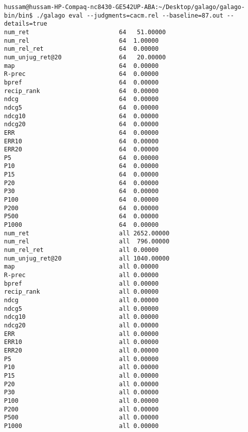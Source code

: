 \begin{lstlisting}[breakatwhitespace=〈false)]
hussam@hussam-HP-Compaq-nc8430-GE542UP-ABA:~/Desktop/galago/galago-bin/bin$ ./galago eval --judgments=cacm.rel --baseline=87.out --details=true
num_ret                      	64   51.00000
num_rel                      	64	1.00000
num_rel_ret                  	64	0.00000
num_unjug_ret@20             	64   20.00000
map                          	64	0.00000
R-prec                       	64	0.00000
bpref                        	64	0.00000
recip_rank                   	64	0.00000
ndcg                         	64	0.00000
ndcg5                        	64	0.00000
ndcg10                       	64	0.00000
ndcg20                       	64	0.00000
ERR                          	64	0.00000
ERR10                        	64	0.00000
ERR20                        	64	0.00000
P5                           	64	0.00000
P10                          	64	0.00000
P15                          	64	0.00000
P20                          	64	0.00000
P30                          	64	0.00000
P100                         	64	0.00000
P200                         	64	0.00000
P500                         	64	0.00000
P1000                        	64	0.00000
num_ret                     	all 2652.00000
num_rel                     	all  796.00000
num_rel_ret                 	all	0.00000
num_unjug_ret@20            	all 1040.00000
map                         	all	0.00000
R-prec                      	all	0.00000
bpref                       	all	0.00000
recip_rank                  	all	0.00000
ndcg                        	all	0.00000
ndcg5                       	all	0.00000
ndcg10                      	all	0.00000
ndcg20                      	all	0.00000
ERR                         	all	0.00000
ERR10                       	all	0.00000
ERR20                       	all	0.00000
P5                          	all	0.00000
P10                         	all	0.00000
P15                         	all	0.00000
P20                         	all	0.00000
P30                         	all	0.00000
P100                        	all	0.00000
P200                        	all	0.00000
P500                        	all	0.00000
P1000                       	all	0.00000
\end{lstlisting}